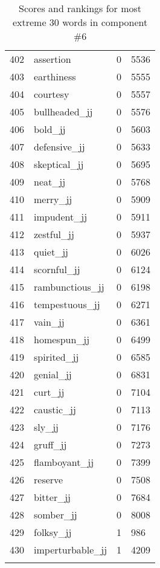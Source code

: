 \begin{longtable}[!htbp]{| rlr@{.}l |}
    402 & assertion & 0 & 5536 \\
    403 & earthiness & 0 & 5555 \\
    404 & courtesy & 0 & 5557 \\
    405 & bullheaded\_jj & 0 & 5576 \\
    406 & bold\_jj & 0 & 5603 \\
    407 & defensive\_jj & 0 & 5633 \\
    408 & skeptical\_jj & 0 & 5695 \\
    409 & neat\_jj & 0 & 5768 \\
    410 & merry\_jj & 0 & 5909 \\
    411 & impudent\_jj & 0 & 5911 \\
    412 & zestful\_jj & 0 & 5937 \\
    413 & quiet\_jj & 0 & 6026 \\
    414 & scornful\_jj & 0 & 6124 \\
    415 & rambunctious\_jj & 0 & 6198 \\
    416 & tempestuous\_jj & 0 & 6271 \\
    417 & vain\_jj & 0 & 6361 \\
    418 & homespun\_jj & 0 & 6499 \\
    419 & spirited\_jj & 0 & 6585 \\
    420 & genial\_jj & 0 & 6831 \\
    421 & curt\_jj & 0 & 7104 \\
    422 & caustic\_jj & 0 & 7113 \\
    423 & sly\_jj & 0 & 7176 \\
    424 & gruff\_jj & 0 & 7273 \\
    425 & flamboyant\_jj & 0 & 7399 \\
    426 & reserve & 0 & 7508 \\
    427 & bitter\_jj & 0 & 7684 \\
    428 & somber\_jj & 0 & 8008 \\
    429 & folksy\_jj & 1 & 986 \\
    430 & imperturbable\_jj & 1 & 4209 \\
    \hline
    \caption{Scores and rankings for most extreme 30 words in component \#6} \\
\end{longtable}
